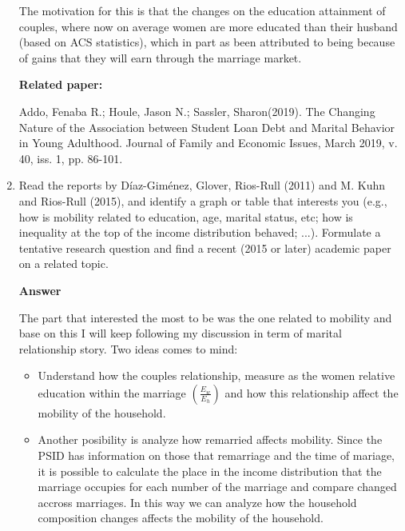 \documentclass[12pt]{article}%
\begin{document}
\begin{enumerate}
	The motivation for this is that the changes on the education attainment of couples, where now on average women are more educated than their husband (based on ACS statistics), which in part as been attributed to being because of gains that they will earn through the marriage market. 
	
	\textbf{Related paper:}
	
	Addo, Fenaba R.; Houle, Jason N.; Sassler, Sharon(2019). The Changing Nature of the Association between Student Loan Debt and Marital Behavior in Young Adulthood. 
	Journal of Family and Economic Issues, March 2019, v. 40, iss. 1, pp. 86-101.
	
	\item Read the reports by Díaz-Giménez, Glover, Rios-Rull (2011) and M. Kuhn and Rios-Rull (2015), and identify a graph or table that interests you
	(e.g., how is mobility related to education, age, marital status, etc; how is inequality at the top of the income distribution behaved; ...). Formulate a tentative research question and find a recent (2015 or later) academic  paper on a related topic.
	
		    	\vspace{3mm}
	
	{\bf Answer}   	
	
	\vspace{3mm}
	
	The part that interested the most to be was the one related to mobility and base on this I will keep following my discussion in term of marital relationship story. Two ideas comes to mind:
	
 \begin{itemize}
 	\item Understand how the couples relationship, measure as the women relative education within the marriage $\left( \frac{E_w}{E_h}\right) $ and how this relationship affect the mobility of the household. 
 	
 	\item Another posibility is analyze how remarried affects mobility. Since the PSID has information on those that remarriage and the time of mariage, it is possible to calculate the place in the income distribution that the marriage occupies for each number of the marriage and compare changed accross marriages. In this way we can analyze how the household composition changes affects the mobility of the household.
 	
 \end{itemize}

	
	

\end{enumerate}
\end{document}
